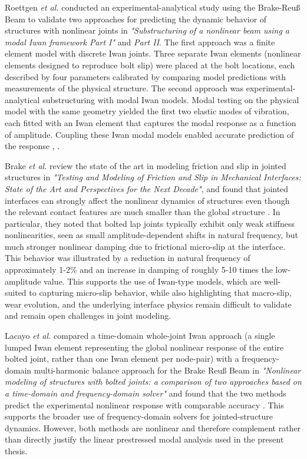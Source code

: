 \documentclass[a4paper,twoside]{bth}
\begin{document}
Roettgen \textit{et al.} conducted an experimental-analytical study using the Brake-Reuß Beam to validate two approaches for predicting the dynamic behavior of structures with nonlinear joints in \textit{"Substructuring of a nonlinear beam using a modal Iwan framework Part I"} and \textit{Part II}.
The first approach was a finite element model with discrete Iwan joints. Three separate Iwan elements (nonlinear elements designed to reproduce bolt slip) were placed at the bolt locations, each described by four parameters calibrated by comparing model predictions with measurements of the physical structure.
The second approach was experimental-analytical substructuring with modal Iwan models. Modal testing on the physical model with the same geometry yielded the first two elastic modes of vibration, each fitted with an Iwan element that captures the modal response as a function of amplitude. Coupling these Iwan modal models enabled accurate prediction of the response \cite{allen_substructuring_2025}, \cite{roettgen2017substructuringPartII}.

Brake \textit{et al.} review the state of the art in modeling friction and slip in jointed structures in \textit{"Testing and Modeling of Friction and Slip in Mechanical Interfaces: State of the Art and Perspectives for the Next Decade"}, and found that jointed interfaces can strongly affect the nonlinear dynamics of structures even though the relevant contact features are much smaller than the global structure \cite{brake_testing_2024}. In particular, they noted that bolted lap joints typically exhibit only weak stiffness nonlinearities, seen as small amplitude-dependent shifts in natural frequency, but much stronger nonlinear damping due to frictional micro-slip at the interface. This behavior was illustrated by a reduction in natural frequency of approximately 1-2\% and an increase in damping of roughly 5-10 times the low-amplitude value. This supports the use of Iwan-type models, which are well-suited to capturing micro-slip behavior, while also highlighting that macro-slip, wear evolution, and the underlying interface physics remain difficult to validate and remain open challenges in joint modeling.

Lacayo \textit{et al.} compared a time-domain whole-joint Iwan approach (a single lumped Iwan element representing the global nonlinear response of the entire bolted joint, rather than one Iwan element per node-pair) with a frequency-domain multi-harmonic balance approach for the Brake Reuß Beam in \textit{"Nonlinear modeling of structures with bolted joints: a comparison of two approaches based on a time-domain and frequency-domain solver"} and found that the two methods predict the experimental nonlinear response with comparable accuracy \cite{15}. This supports the broader use of frequency-domain solvers for jointed-structure dynamics. However, both methods are nonlinear and therefore complement rather than directly justify the linear prestressed modal analysis used in the present thesis.
\end{document}

